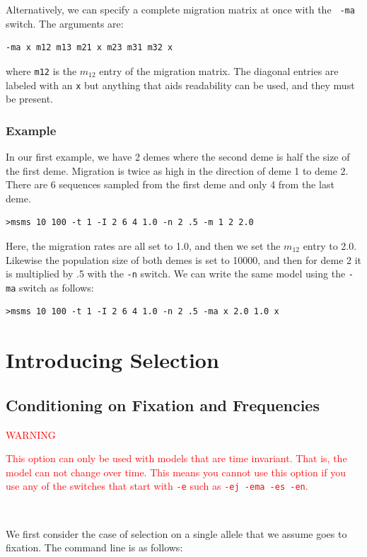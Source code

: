 \documentclass{article}
\begin{document}
Alternatively, we can specify a complete migration matrix at once with the {\tt
-ma} switch. The arguments are:
\begin{verbatim}
-ma x m12 m13 m21 x m23 m31 m32 x
\end{verbatim}
where {\tt m12} is the $m_{12}$ entry of the migration matrix. The
diagonal entries are labeled with an {\tt x} but anything that aids readability
can be used, and they must be present. 

\subsubsection{Example}

In our first example, we have 2 demes where the second deme is half the size of
the first deme. Migration is twice as high in the direction of deme 1 to deme 2.
There are 6 sequences sampled from the first deme and only 4 from the last deme.
\begin{verbatim}
>msms 10 100 -t 1 -I 2 6 4 1.0 -n 2 .5 -m 1 2 2.0
\end{verbatim} 
Here, the migration rates are all set to 1.0, and then we set the $m_{12}$ entry
to 2.0. Likewise the population size of both demes is set to 10000, and then
for deme 2 it is multiplied by .5 with the {\tt -n} switch. We can write the same model
using the {\tt -ma} switch as follows:
\begin{verbatim}
>msms 10 100 -t 1 -I 2 6 4 1.0 -n 2 .5 -ma x 2.0 1.0 x
\end{verbatim} 


\newpage

\section{Introducing Selection}
\label{simpleSelection}
\subsection{Conditioning on Fixation and Frequencies}
\textcolor{red}{
\begin{center}
{\large WARNING}
\end{center}
This option can only be used with models that
are time invariant. That is, the model can not change over time. This means you
cannot use this option if you use any of the switches that start with {\tt -e}
such as {\tt -ej -ema -es -en}. }
\ \newline

We first consider the case of selection on a single allele that we assume goes
to fixation. The command line is as follows:
\end{document}
